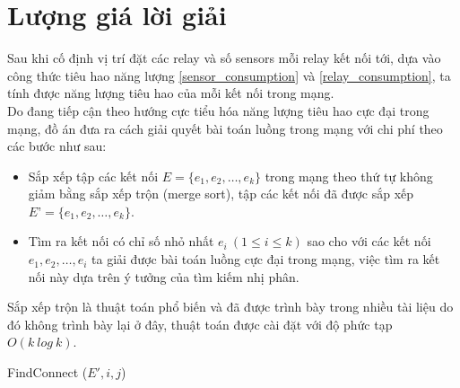 \section{Lượng giá lời giải}
Sau khi cố định  vị  trí đặt các relay và số sensors mỗi relay kết nối tới, dựa vào công thức tiêu hao năng lượng \ref{sensor_consumption} và \ref{relay_consumption}, ta tính được năng lượng tiêu hao của mỗi kết nối trong mạng.
\\Do đang tiếp cận theo hướng cực tiểu hóa năng lượng tiêu hao cực đại trong mạng, đồ án đưa ra cách giải quyết bài toán luồng trong mạng với chi  phí theo các bước như sau:
\begin{itemize}
    \item Sắp xếp tập các kết nối $E = \{e_1, e_2,…, e_k\}$ trong mạng theo thứ tự không giảm bằng sắp xếp trộn (merge sort), tập các kết nối đã được sắp xếp $E’ = \{e_1, e_2,…, e_k\}$.
    \item Tìm ra kết nối có chỉ  số nhỏ nhất $e_i ~(1 \leq i \leq k)$ sao cho với các kết nối $e_1, e_2, …, e_i$ ta giải được bài toán luồng cực đại trong mạng, việc tìm ra kết nối này dựa trên ý tưởng của tìm kiếm nhị phân.
\end{itemize}
Sắp xếp trộn là thuật toán phổ biến và đã được trình bày trong nhiều tài liệu do đó không trình bày lại ở đây, thuật toán được cài đặt với độ phức tạp $O (k ~log ~k)$.

\begin{algorithm}[H]
    \SetAlgoLined
    \BlankLine
    \caption{FindConnect ($E', i, j$)}      
\end{algorithm}

